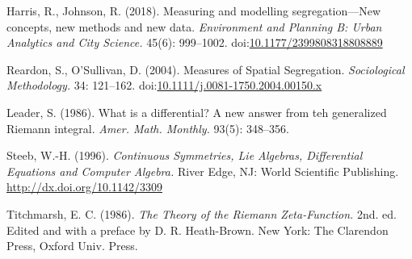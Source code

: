 \documentclass{article}
\theoremstyle{theorem}
\theoremstyle{definition}
\begin{document}
\begin{thebibliography}{3}

Harris, R., Johnson, R. (2018). Measuring and modelling segregation---New concepts, new methods and new data. \textit{Environment and Planning B: Urban Analytics and City Science.} 45(6): 999--1002. doi:\href{http://dx.doi.org/10.1177/2399808318808889}{10.1177/2399808318808889}

Reardon, S., O'Sullivan, D. (2004). Measures of Spatial Segregation. \textit{Sociological Methodology.} 34: 121--162. doi:\href{http://dx.doi.org/10.1111/j.0081-1750.2004.00150.x}{10.1111/j.0081-1750.2004.00150.x}

Leader, S. (1986). What is a differential? A new answer from teh generalized Riemann integral. {\it Amer. Math. Monthly.\/} 93(5): 348--356.

Steeb, W.-H. (1996). \textit{Continuous Symmetries, Lie Algebras, Differential Equations and Computer Algebra.\/} River Edge, NJ: World Scientific Publishing.  \href{http://dx.doi.org/10.1142/3309}{\url{http://dx.doi.org/10.1142/3309}}


Titchmarsh, E. C. (1986). {\it The Theory of the Riemann Zeta-Function.\/} 2nd. ed. Edited and with a preface by D. R. Heath-Brown. New York: The Clarendon Press, Oxford Univ. Press.

\end{thebibliography}
\end{document}
